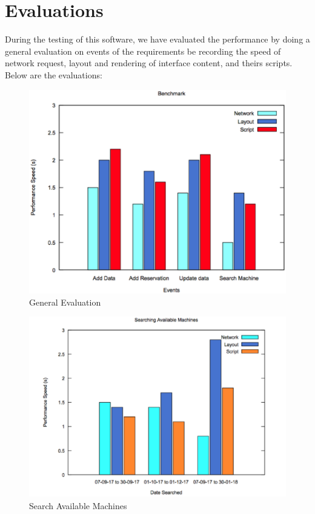 \section{Evaluations}
During the testing of this software, we have evaluated the performance by doing a general evaluation on events of the requirements be recording the speed of network request, layout and rendering of interface content, and theirs scripts.  Below are the evaluations:
\begin{figure}[h]
 \includegraphics[width=\linewidth]{evaluation.eps}
  \caption{General Evaluation }
\end{figure}

\begin{figure}[h]
 \includegraphics[width=\linewidth]{evaluation2.eps}
  \caption{Search Available Machines}
\end{figure}
